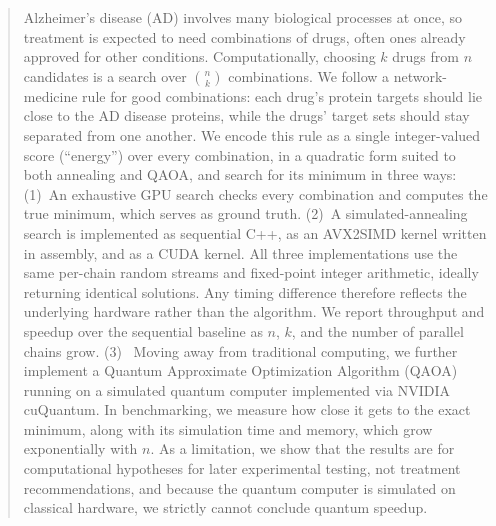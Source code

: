 \begin{abstract}
Alzheimer's disease (AD) involves many biological processes at once, so treatment is expected to need combinations of drugs, often ones already approved for other conditions. Computationally, choosing $k$ drugs from $n$ candidates is a search over $\binom{n}{k}$ combinations. We follow a network-medicine rule for good combinations: each drug's protein targets should lie close to the AD disease proteins, while the drugs' target sets should stay separated from one another. We encode this rule as a single integer-valued score (``energy'') over every combination, in a quadratic form suited to both annealing and QAOA, and search for its minimum in three ways: (1)~An exhaustive GPU search checks every combination and computes the true minimum, which serves as ground truth. (2)~A simulated-annealing search is implemented as sequential C++, as an AVX2SIMD kernel written in assembly, and as a CUDA kernel. All three implementations use the same per-chain random streams and fixed-point integer arithmetic, ideally returning identical solutions. Any timing difference therefore reflects the underlying hardware rather than the algorithm. We report throughput and speedup over the sequential baseline as $n$, $k$, and the number of parallel chains grow. (3)~ Moving away from traditional computing, we further implement a Quantum Approximate Optimization Algorithm (QAOA) running on a simulated quantum computer implemented via NVIDIA cuQuantum. In benchmarking, we measure how close it gets to the exact minimum, along with its simulation time and memory, which grow exponentially with $n$. As a limitation, we show that the results are for computational hypotheses for later experimental testing, not treatment recommendations, and because the quantum computer is simulated on classical hardware, we strictly cannot conclude quantum speedup.\end{abstract}